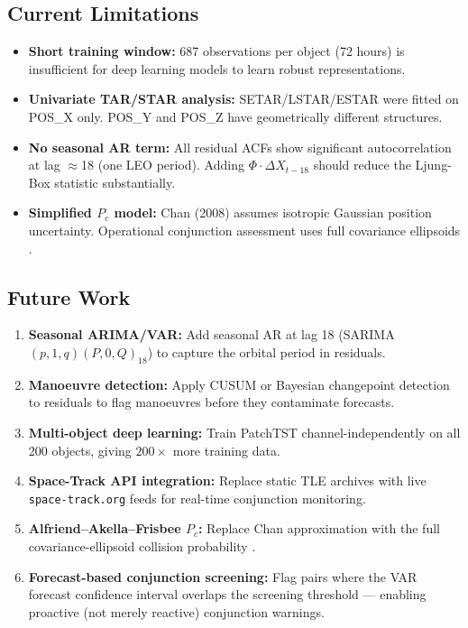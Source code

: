 \documentclass[conference]{IEEEtran}
\begin{document}
\subsection{Current Limitations}

\begin{itemize}
  \item \textbf{Short training window:} 687 observations per object (72 hours)
        is insufficient for deep learning models to learn robust representations.
  \item \textbf{Univariate TAR/STAR analysis:} SETAR/LSTAR/ESTAR were fitted
        on POS\_X only. POS\_Y and POS\_Z have geometrically different
        structures.
  \item \textbf{No seasonal AR term:} All residual ACFs show significant
        autocorrelation at lag $\approx$18 (one LEO period). Adding
        $\Phi\cdot\Delta X_{t-18}$ should reduce the Ljung-Box statistic
        substantially.
  \item \textbf{Simplified $P_c$ model:} Chan (2008) assumes isotropic
        Gaussian position uncertainty. Operational conjunction assessment
        uses full covariance ellipsoids \cite{alfriend2000}.
\end{itemize}

\subsection{Future Work}

\begin{enumerate}
  \item \textbf{Seasonal ARIMA/VAR:} Add seasonal AR at lag 18
        (SARIMA$(p,1,q)(P,0,Q)_{18}$) to capture the orbital period in
        residuals.
  \item \textbf{Manoeuvre detection:} Apply CUSUM or Bayesian changepoint
        detection to residuals to flag manoeuvres before they contaminate
        forecasts.
  \item \textbf{Multi-object deep learning:} Train PatchTST
        channel-independently on all 200 objects, giving $200\times$ more
        training data.
  \item \textbf{Space-Track API integration:} Replace static TLE archives with
        live \texttt{space-track.org} feeds for real-time conjunction monitoring.
  \item \textbf{Alfriend--Akella--Frisbee $P_c$:} Replace Chan approximation
        with the full covariance-ellipsoid collision probability
        \cite{alfriend2000}.
  \item \textbf{Forecast-based conjunction screening:} Flag pairs where the
        VAR forecast confidence interval overlaps the screening threshold ---
        enabling proactive (not merely reactive) conjunction warnings.
\end{enumerate}
\end{document}
